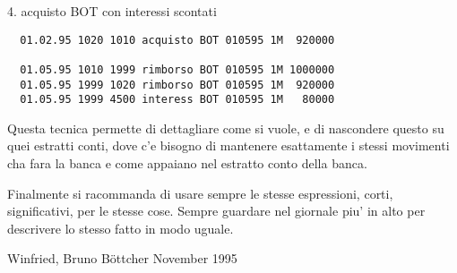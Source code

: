 \documentclass[12pt]{report}
\begin{document}
\begin{appendix}
4. acquisto BOT con interessi scontati
\begin{verbatim}
  01.02.95 1020 1010 acquisto BOT 010595 1M  920000

  01.05.95 1010 1999 rimborso BOT 010595 1M 1000000
  01.05.95 1999 1020 rimborso BOT 010595 1M  920000
  01.05.95 1999 4500 interess BOT 010595 1M   80000
\end{verbatim}

Questa tecnica permette di dettagliare come si vuole, e di nascondere questo
su quei estratti conti, dove c'e bisogno di mantenere esattamente i stessi
movimenti cha fara la banca e come appaiano nel estratto conto della banca.

Finalmente si racommanda di usare sempre le stesse espressioni, corti, 
significativi, per le stesse cose. Sempre guardare nel giornale piu' in alto
per descrivere lo stesso fatto in modo uguale.


Winfried, Bruno Böttcher
November 1995
\end{appendix}
\end{document}
